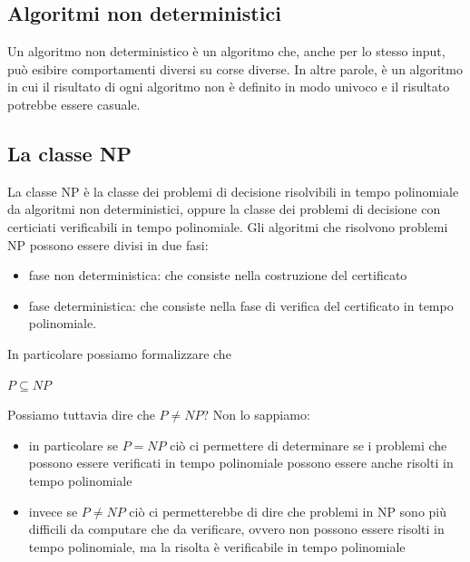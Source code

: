 \documentclass[11pt, oneside]{article}   	%
\begin{document}
\subsection*{Algoritmi non deterministici}
Un algoritmo non deterministico è un algoritmo che, anche per lo stesso input, può esibire comportamenti diversi su corse diverse. In altre parole, è un algoritmo in cui il risultato di ogni algoritmo non è definito in modo univoco e il risultato potrebbe essere casuale.
\subsection*{La classe NP}
La classe NP è la classe dei problemi di decisione risolvibili in tempo polinomiale da algoritmi non deterministici, oppure la classe dei problemi di decisione con certiciati verificabili in tempo polinomiale.
Gli algoritmi che risolvono problemi NP possono essere divisi in due fasi:
\begin{itemize}
\item fase non deterministica: che consiste nella costruzione del certificato
\item fase deterministica: che consiste nella fase di verifica del certificato in tempo polinomiale.
\end{itemize}
In particolare possiamo formalizzare che
\begin{center} $P \subseteq NP$\end{center}
Possiamo tuttavia dire che $P \neq NP$? Non lo sappiamo:
\begin{itemize}
\item in particolare se $P = NP$ ciò ci permettere di determinare se i problemi che possono essere verificati in tempo polinomiale possono essere anche risolti in tempo polinomiale
\item invece se $P \neq NP$ ciò ci permetterebbe di dire che problemi in NP sono più difficili da computare che da verificare, ovvero non possono essere risolti in tempo polinomiale, ma la risolta è verificabile in tempo polinomiale
\end{itemize}
\end{document}

